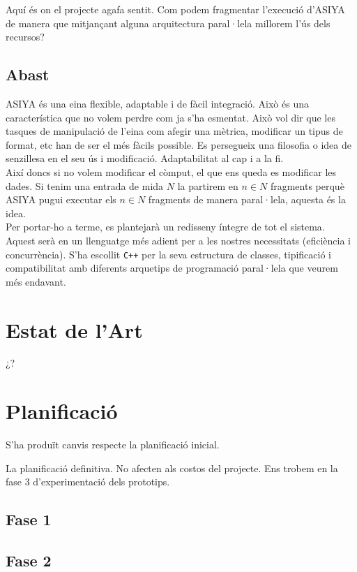 \documentclass[11pt,a4paper]{article}
\begin{document}
Aquí és on el projecte agafa sentit. Com podem fragmentar l'execució d'ASIYA de manera que mitjançant alguna arquitectura paral·lela millorem l'ús dels recursos?
\\

\subsection{Abast}
ASIYA és una eina flexible, adaptable i de fàcil integració. Això és una característica que no volem perdre com ja s'ha esmentat. Això vol dir que les tasques de manipulació de l'eina com afegir una mètrica, modificar un tipus de format, etc han de ser el més fàcils possible. Es persegueix una filosofia o idea de senzillesa en el seu ús i modificació. Adaptabilitat al cap i a la fi.
\\

Així doncs si no volem modificar el còmput, el que ens queda es modificar les dades. Si tenim una entrada de mida $N$ la partirem en $n \in N$ fragments perquè ASIYA pugui executar els $n \in N$ fragments de manera paral·lela, aquesta és la idea.
\\

Per portar-ho a terme, es plantejarà un redisseny íntegre de tot el sistema. Aquest serà en un llenguatge més adient per a les nostres necessitats (eficiència i concurrència). S'ha escollit \texttt{C++} per la seva estructura de classes, tipificació i compatibilitat amb diferents arquetips de programació paral·lela que veurem més endavant.
\newpage
\section{Estat de l'Art}
¿?

\newpage
\section{Planificació}
S'ha produït canvis respecte la planificació inicial.

La planificació definitiva.
No afecten als costos del projecte.
Ens trobem en la fase 3 d'experimentació dels prototips.

\subsection{Fase 1}
\subsection{Fase 2}
\end{document}
